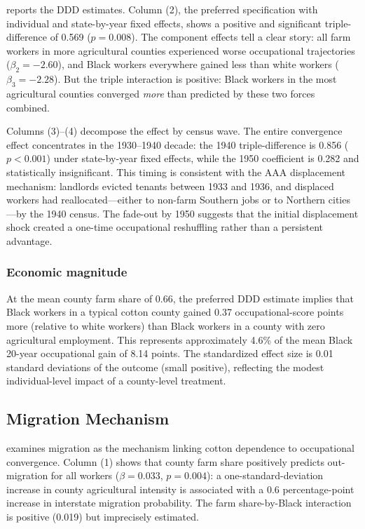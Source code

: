 \documentclass[12pt]{article}
\begin{document}


 reports the DDD estimates. Column (2), the preferred specification with individual and state-by-year fixed effects, shows a positive and significant triple-difference of 0.569 ($p = 0.008$). The component effects tell a clear story: all farm workers in more agricultural counties experienced worse occupational trajectories ($\beta_2 = -2.60$), and Black workers everywhere gained less than white workers ($\beta_3 = -2.28$). But the triple interaction is positive: Black workers in the most agricultural counties converged \textit{more} than predicted by these two forces combined.

Columns (3)--(4) decompose the effect by census wave. The entire convergence effect concentrates in the 1930--1940 decade: the 1940 triple-difference is 0.856 ($p < 0.001$) under state-by-year fixed effects, while the 1950 coefficient is 0.282 and statistically insignificant. This timing is consistent with the AAA displacement mechanism: landlords evicted tenants between 1933 and 1936, and displaced workers had reallocated---either to non-farm Southern jobs or to Northern cities---by the 1940 census. The fade-out by 1950 suggests that the initial displacement shock created a one-time occupational reshuffling rather than a persistent advantage.

\subsubsection*{Economic magnitude} At the mean county farm share of 0.66, the preferred DDD estimate implies that Black workers in a typical cotton county gained 0.37 occupational-score points more (relative to white workers) than Black workers in a county with zero agricultural employment. This represents approximately 4.6\% of the mean Black 20-year occupational gain of 8.14 points. The standardized effect size is 0.01 standard deviations of the outcome (small positive), reflecting the modest individual-level impact of a county-level treatment.

\subsection{Migration Mechanism}



 examines migration as the mechanism linking cotton dependence to occupational convergence. Column (1) shows that county farm share positively predicts out-migration for all workers ($\beta = 0.033$, $p = 0.004$): a one-standard-deviation increase in county agricultural intensity is associated with a 0.6 percentage-point increase in interstate migration probability. The farm share-by-Black interaction is positive (0.019) but imprecisely estimated.
\end{document}
